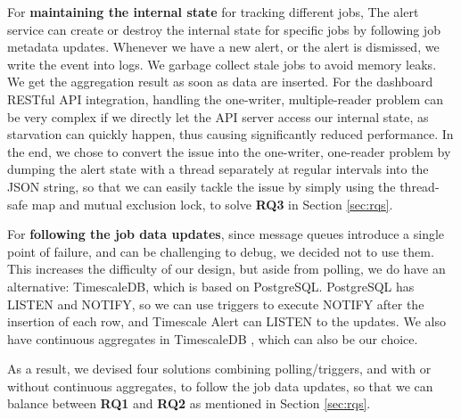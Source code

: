 For \textbf{maintaining the internal state} for tracking different jobs, The alert service can create or destroy the internal state for specific jobs by following job metadata updates. Whenever we have a new alert, or the alert is dismissed, we write the event into logs. We garbage collect stale jobs to avoid memory leaks. We get the aggregation result as soon as data are inserted. For the dashboard RESTful API integration, handling the one-writer, multiple-reader problem can be very complex if we directly let the API server access our internal state, as starvation can quickly happen, thus causing significantly reduced performance. In the end, we chose to convert the issue into the one-writer, one-reader problem by dumping the alert state with a thread separately at regular intervals into the JSON string, so that we can easily tackle the issue by simply using the thread-safe map and mutual exclusion lock, to solve \textbf{RQ3} in Section \ref{sec:rqs}.

For \textbf{following the job data updates}, since message queues introduce a single point of failure, and can be challenging to debug, we decided not to use them. This increases the difficulty of our design, but aside from polling, we do have an alternative: TimescaleDB, which is based on PostgreSQL. PostgreSQL has LISTEN and NOTIFY, so we can use triggers to execute NOTIFY after the insertion of each row, and Timescale Alert can LISTEN to the updates. We also have continuous aggregates in TimescaleDB \cite{ConAggs}, which can also be our choice.

As a result, we devised four solutions combining polling/triggers, and with or without continuous aggregates, to follow the job data updates, so that we can balance between \textbf{RQ1} and \textbf{RQ2} as mentioned in Section \ref{sec:rqs}.

